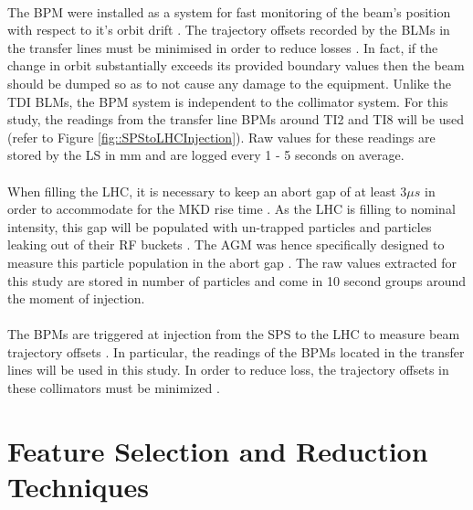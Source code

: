 \paragraph{ }The \ac{BPM} were installed as a system for fast monitoring of the beam's position with respect to it's orbit drift \cite{Schmidt2006}. The trajectory offsets recorded by the \acs{BLM}s in the transfer lines must be minimised in order to reduce losses \cite{Drosdal2011}. In fact, if the change in orbit substantially exceeds its provided boundary values then the beam should be dumped \cite{Schmidt2006} so as to not cause any damage to the equipment. Unlike the \acs{TDI} \acs{BLM}s, the \acs{BPM} system is independent to the collimator system. For this study, the readings from the transfer line \acs{BPM}s around TI2 and TI8 will be used (refer to Figure \ref{fig::SPStoLHCInjection}). Raw values for these readings are stored by the \acs{LS} in \ac{mm} and are logged every 1 - 5 seconds on average.

\paragraph{ }When filling the \acs{LHC}, it is necessary to keep an abort gap of at least 3$\mu s$ in order to accommodate for the \ac{MKD} rise time \cite{Meddahi2010}. As the \ac{LHC} is filling to nominal intensity, this gap will be populated with un-trapped particles and particles leaking out of their \ac{RF} buckets \cite{Meddahi2010}. The \ac{AGM} was hence specifically designed to measure this particle population in the abort gap \cite{Lefevre2010}. The raw values extracted for this study are stored in number of particles and come in 10 second groups around the moment of injection.
 

\paragraph{ }The \acs{BPM}s are triggered at injection from the \acs{SPS} to the \acs{LHC} to measure beam trajectory offsets \cite{Drosdal2011}. In particular, the readings of the \acs{BPM}s located in the transfer lines will be used in this study. In order to reduce loss, the trajectory offsets in these collimators must be minimized \cite{Drosdal2011}. 



\section{Feature Selection and Reduction Techniques}

